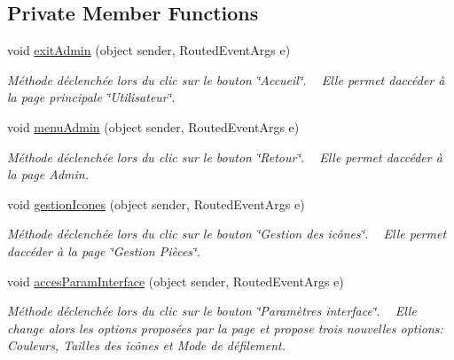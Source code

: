 \subsection*{Private Member Functions}
\begin{DoxyCompactItemize}
\item 
void \hyperlink{class_my_domotik_1_1_admin_page_a0cca11cfca845844ce5e3b32245467b3}{exit\+Admin} (object sender, Routed\+Event\+Args e)
\begin{DoxyCompactList}\small\item\em Méthode déclenchée lors du clic sur le bouton \char`\"{}\+Accueil\char`\"{}. ~\newline
Elle permet d\textquotesingle{}accéder à la page principale \char`\"{}\+Utilisateur\char`\"{}. \end{DoxyCompactList}\item 
void \hyperlink{class_my_domotik_1_1_admin_page_a733216c38f9fc437b4d38a8b00baa9c7}{menu\+Admin} (object sender, Routed\+Event\+Args e)
\begin{DoxyCompactList}\small\item\em Méthode déclenchée lors du clic sur le bouton \char`\"{}\+Retour\char`\"{}. ~\newline
Elle permet d\textquotesingle{}accéder à la page Admin. \end{DoxyCompactList}\item 
void \hyperlink{class_my_domotik_1_1_admin_page_a150438bf87de0c2cf85d40a1a8cc9587}{gestion\+Icones} (object sender, Routed\+Event\+Args e)
\begin{DoxyCompactList}\small\item\em Méthode déclenchée lors du clic sur le bouton \char`\"{}\+Gestion des icônes\char`\"{}. ~\newline
Elle permet d\textquotesingle{}accéder à la page \char`\"{}\+Gestion Pièces\char`\"{}. \end{DoxyCompactList}\item 
void \hyperlink{class_my_domotik_1_1_admin_page_a7927fe5f8dcd8e584a82a72353289554}{acces\+Param\+Interface} (object sender, Routed\+Event\+Args e)
\begin{DoxyCompactList}\small\item\em Méthode déclenchée lors du clic sur le bouton \char`\"{}\+Paramètres interface\char`\"{}. ~\newline
Elle change alors les options proposées par la page et propose trois nouvelles options\+: Couleurs, Tailles des icônes et Mode de défilement. \end{DoxyCompactList}\item 

\end{DoxyCompactItemize}
